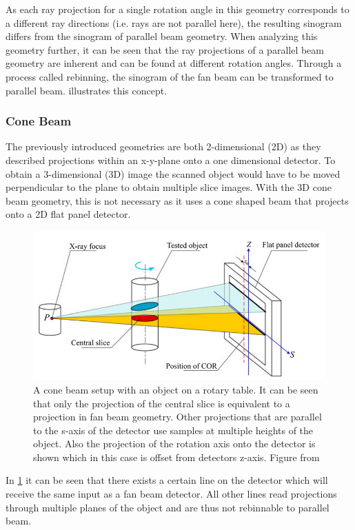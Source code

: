 \documentclass[10pt,journal,compsoc]{IEEEtran}
\begin{document}
As each ray projection for a single rotation angle in this geometry corresponds to a different ray directions (i.e. rays are not parallel here), the resulting sinogram differs from the sinogram of parallel beam geometry.
When analyzing this geometry further, it can be seen that the ray projections of a parallel beam geometry are inherent and can be found at different rotation angles.
Through a process called rebinning, the sinogram of the fan beam can be transformed to parallel beam.
 illustrates this concept.
 

\subsubsection{Cone Beam}\label{sssec:conebeam}
The previously introduced geometries are both 2-dimensional (2D) as they described projections within an x-y-plane onto a one dimensional detector.
To obtain a 3-dimensional (3D) image the scanned object would have to be moved perpendicular to the plane to obtain multiple slice images.
With the 3D cone beam geometry, this is not necessary as it uses a cone shaped beam that projects onto a 2D flat panel detector.
%
\begin{figure}
\centering
\includegraphics[width=\linewidth]{img/conebeam_centralslice.png}
\caption{
A cone beam setup with an object on a rotary table.
It can be seen that only the projection of the central slice is equivalent to a projection in fan beam geometry.
Other projections that are parallel to the s-axis of the detector use samples at multiple heights of the object.
Also the projection of the rotation axis onto the detector is shown which in this case is offset from detectors
z-axis.
Figure from \cite{Yang2011}
}
\label{fig:conebeam}
\end{figure}
%
In \cref{fig:conebeam} it can be seen that there exists a certain line on the detector which will receive the same input as a fan beam detector.
All other lines read projections through multiple planes of the object and are thus not rebinnable to parallel beam.
\end{document}
